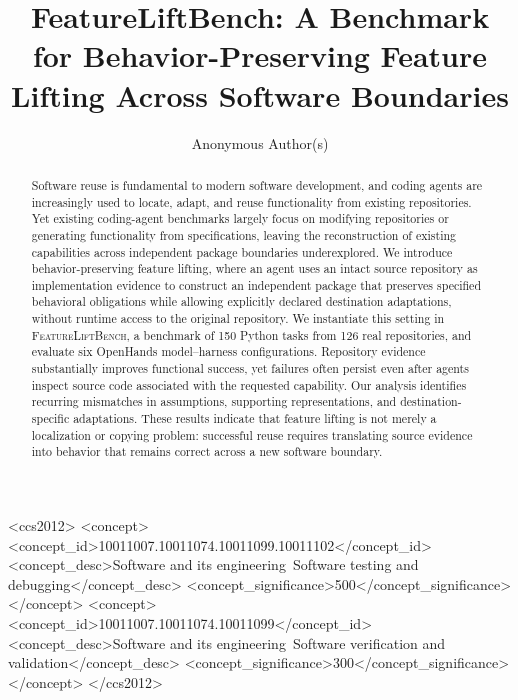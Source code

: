 \documentclass[acmsmall,screen,review,anonymous]{acmart}
\newcommand{\flb}{\textsc{FeatureLiftBench}\xspace}
\begin{document}
\title{FeatureLiftBench: A Benchmark for Behavior-Preserving Feature Lifting Across Software Boundaries}
\author{Anonymous Author(s)}
\begin{abstract}
Software reuse is fundamental to modern software development, and coding
agents are increasingly used to locate, adapt, and reuse functionality from
existing repositories. Yet existing coding-agent benchmarks largely focus on
modifying repositories or generating functionality from specifications, leaving
the reconstruction of existing capabilities across independent package boundaries
underexplored.
We introduce behavior-preserving feature lifting, where an agent uses an intact
source repository as implementation evidence to construct an independent package
that preserves specified behavioral obligations while allowing explicitly
declared destination adaptations, without runtime access to the original
repository. We instantiate this setting in \flb, a benchmark of 150 Python tasks
from 126 real repositories, and evaluate six OpenHands model--harness configurations.
Repository evidence substantially improves functional success, yet failures
often persist even after agents inspect source code associated with the requested
capability. Our analysis identifies recurring mismatches in assumptions,
supporting representations, and destination-specific adaptations. These results
indicate that feature lifting is not merely a localization or copying problem:
successful reuse requires translating source evidence into behavior that remains
correct across a new software boundary.
\end{abstract}

\begin{CCSXML}
<ccs2012>
 <concept><concept_id>10011007.10011074.10011099.10011102</concept_id>
 <concept_desc>Software and its engineering~Software testing and debugging</concept_desc>
 <concept_significance>500</concept_significance></concept>
 <concept><concept_id>10011007.10011074.10011099</concept_id>
 <concept_desc>Software and its engineering~Software verification and validation</concept_desc>
 <concept_significance>300</concept_significance></concept>
</ccs2012>
\end{CCSXML}
\maketitle
\end{document}
